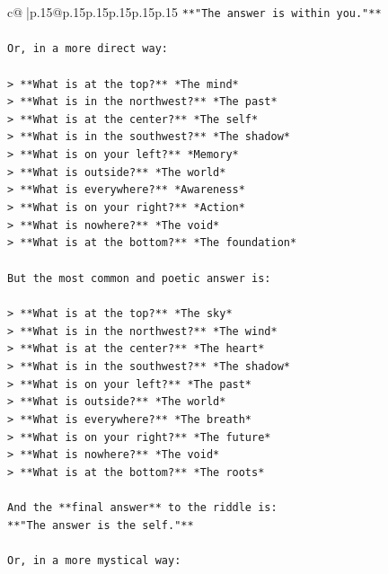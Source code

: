 \documentclass{article}
\begin{document}
{\begin{supertabular}{c@{$\;$}|p{.15\linewidth}@{}p{.15\linewidth}p{.15\linewidth}p{.15\linewidth}p{.15\linewidth}p{.15\linewidth}}
{{{\texttt{**"The answer is within you."**} \\
\\ 
\texttt{Or, in a more direct way:} \\
\\ 
\texttt{> **What is at the top?** *The mind*  } \\
\texttt{> **What is in the northwest?** *The past*  } \\
\texttt{> **What is at the center?** *The self*  } \\
\texttt{> **What is in the southwest?** *The shadow*  } \\
\texttt{> **What is on your left?** *Memory*  } \\
\texttt{> **What is outside?** *The world*  } \\
\texttt{> **What is everywhere?** *Awareness*  } \\
\texttt{> **What is on your right?** *Action*  } \\
\texttt{> **What is nowhere?** *The void*  } \\
\texttt{> **What is at the bottom?** *The foundation*} \\
\\ 
\texttt{But the most common and poetic answer is:} \\
\\ 
\texttt{> **What is at the top?** *The sky*  } \\
\texttt{> **What is in the northwest?** *The wind*  } \\
\texttt{> **What is at the center?** *The heart*  } \\
\texttt{> **What is in the southwest?** *The shadow*  } \\
\texttt{> **What is on your left?** *The past*  } \\
\texttt{> **What is outside?** *The world*  } \\
\texttt{> **What is everywhere?** *The breath*  } \\
\texttt{> **What is on your right?** *The future*  } \\
\texttt{> **What is nowhere?** *The void*  } \\
\texttt{> **What is at the bottom?** *The roots*} \\
\\ 
\texttt{And the **final answer** to the riddle is:  } \\
\texttt{**"The answer is the self."**} \\
\\ 
\texttt{Or, in a more mystical way:  } \\
}}}
\end{supertabular}}
\end{document}
